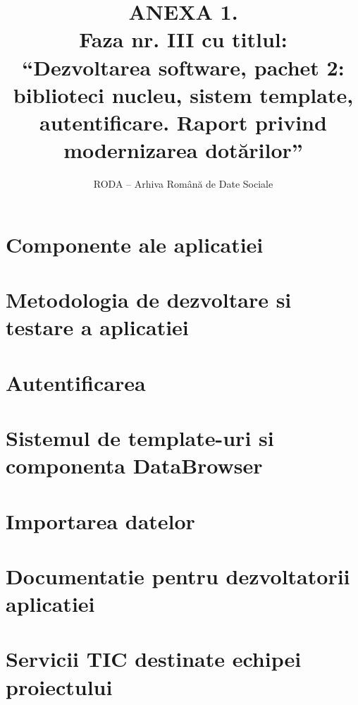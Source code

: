 \documentclass[11pt,twoside,romanian]{extbook}
\begin{document}
\fancyhead[RE,LO]{\thepage}

\title{ANEXA 1.\\
Faza nr. III 
cu titlul:\\
``Dezvoltarea software, pachet 2: biblioteci nucleu, sistem template, autentificare. Raport privind modernizarea dot\u{a}rilor''
}

\author{RODA -- Arhiva Rom\^{a}n\u{a} de Date Sociale}

\date{ }

\maketitle

\newpage
\thispagestyle{plain}
\tableofcontents{}
\setcounter{page}{1}

\chapter{Componente ale aplicatiei}


\chapter{Metodologia de dezvoltare si testare a aplicatiei}


\chapter{Autentificarea} 


\chapter{Sistemul de template-uri si componenta DataBrowser}


\chapter{Importarea datelor}


\chapter{Documentatie pentru dezvoltatorii aplicatiei} 


\chapter{Servicii TIC destinate echipei proiectului}

\end{document}
